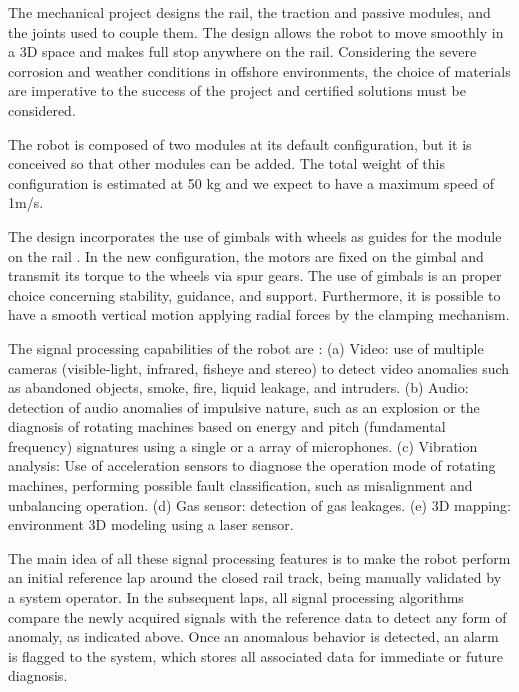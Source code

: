 \documentclass{ifacconf}
\begin{document}
The mechanical project designs the rail, the
traction and passive modules, and the joints used to couple them. The design
allows the robot to move smoothly in a 3D space and makes full stop anywhere
on the rail. Considering the severe corrosion and weather conditions in
offshore environments, the choice of materials are imperative to the success of
the project and certified solutions must be considered.

The robot is composed of two modules at its default configuration, but it is
conceived so that other modules can be added. The total weight of this
configuration is estimated at 50 kg and we expect to have a maximum speed of
1m/s.

The design incorporates the use of gimbals with wheels as guides for
the module on the rail \cite{cba}. In the new configuration, the motors are
fixed on the gimbal and transmit its torque to the wheels via spur gears. The use of gimbals
is an proper choice concerning stability, guidance, and support. Furthermore,
it is possible to have a smooth vertical motion applying radial forces by the
clamping mechanism.

The signal processing capabilities of the robot are \cite{cba}: (a) Video: use
of multiple cameras (visible-light, infrared, fisheye and stereo) to detect
video anomalies such as abandoned objects, smoke, fire, liquid leakage, and
intruders. (b) Audio: detection of audio anomalies of impulsive nature, such as
an explosion or the diagnosis of rotating machines based on energy and pitch
(fundamental frequency) signatures using a single or a array of microphones. (c)
Vibration analysis: Use of acceleration sensors to diagnose the operation mode
of rotating machines, performing possible fault classification, such as
 misalignment and unbalancing operation. (d) Gas sensor: detection of gas
 leakages. (e) 3D mapping: environment 3D modeling using a laser sensor.

The main idea of all these signal processing features is to make the robot
perform an initial reference lap around the closed rail track, being manually
validated by a system operator. In the subsequent laps, all signal processing
algorithms compare the newly acquired signals with the reference data to detect
any form of anomaly, as indicated above. Once an anomalous behavior is
detected, an alarm is flagged to the system, which stores all associated data
for immediate or future diagnosis.
\end{document}
